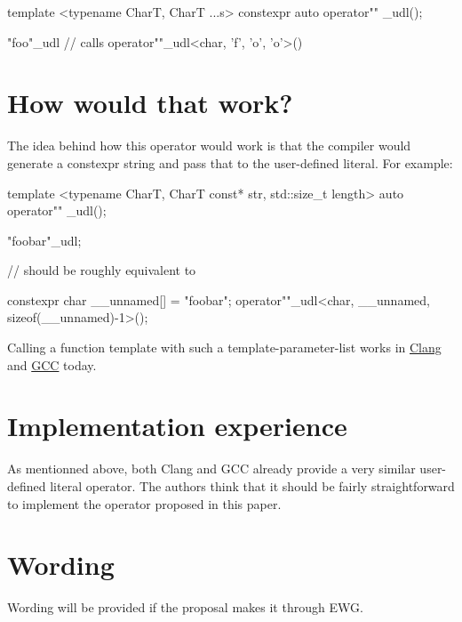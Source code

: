\documentclass{wg21}
\begin{document}
\begin{cpp}
template <typename CharT, CharT ...s>
constexpr auto operator"" _udl();

"foo"_udl // calls operator""_udl<char, 'f', 'o', 'o'>()
\end{cpp}


\section{How would that work?}
The idea behind how this operator would work is that the compiler would
generate a constexpr string and pass that to the user-defined literal.
For example:

\begin{cpp}
template <typename CharT, CharT const* str, std::size_t length>
auto operator"" _udl();

"foobar"_udl;

// should be roughly equivalent to

constexpr char __unnamed[] = "foobar";
operator""_udl<char, __unnamed, sizeof(__unnamed)-1>();
\end{cpp}

Calling a function template with such a template-parameter-list works in
\href{https://wandbox.org/permlink/RBV6abYfNee94wlW}{Clang} and
\href{https://wandbox.org/permlink/rZEY8vDB5mHMPmmd}{GCC} today.


\section{Implementation experience}
As mentionned above, both Clang and GCC already provide a very similar
user-defined literal operator. The authors think that it should be fairly
straightforward to implement the operator proposed in this paper.


\section{Wording}
Wording will be provided if the proposal makes it through EWG.
\end{document}

